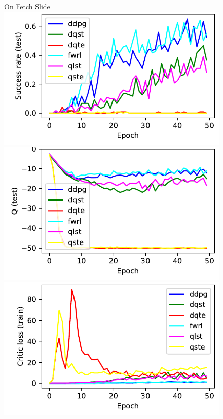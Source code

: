 \begin{figure}
  On Fetch Slide\\
  \includegraphics[width=\frac\columnwidth]{media/res/38f4625-FetchSlide-v1-fwrl-future/test/success_rate.pdf}%
  \includegraphics[width=\frac\columnwidth]{media/res/38f4625-FetchSlide-v1-fwrl-future/test/mean_Q.pdf}%
  \includegraphics[width=\frac\columnwidth]{media/res/38f4625-FetchSlide-v1-fwrl-future/train/critic_loss.pdf}%

\end{figure}
